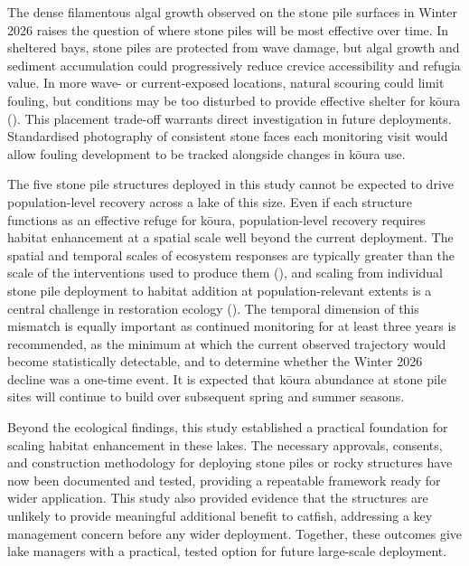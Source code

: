 \documentclass[
  letterpaper,
  DIV=11,
  numbers=noendperiod]{scrartcl}
\begin{document}
The dense filamentous algal growth observed on the stone pile surfaces
in Winter 2026 raises the question of where stone piles will be most
effective over time. In sheltered bays, stone piles are protected from
wave damage, but algal growth and sediment accumulation could
progressively reduce crevice accessibility and refugia value. In more
wave- or current-exposed locations, natural scouring could limit
fouling, but conditions may be too disturbed to provide effective
shelter for kōura ().
This placement trade-off warrants direct investigation in future
deployments. Standardised photography of consistent stone faces each
monitoring visit would allow fouling development to be tracked alongside
changes in kōura use.

The five stone pile structures deployed in this study cannot be expected
to drive population-level recovery across a lake of this size. Even if
each structure functions as an effective refuge for kōura,
population-level recovery requires habitat enhancement at a spatial
scale well beyond the current deployment. The spatial and temporal
scales of ecosystem responses are typically greater than the scale of
the interventions used to produce them (), and scaling from individual stone pile deployment to
habitat addition at population-relevant extents is a central challenge
in restoration ecology (). The temporal dimension of this mismatch is equally important as
continued monitoring for at least three years is recommended, as the
minimum at which the current observed trajectory would become
statistically detectable, and to determine whether the Winter 2026
decline was a one-time event. It is expected that kōura abundance at
stone pile sites will continue to build over subsequent spring and
summer seasons.

Beyond the ecological findings, this study established a practical
foundation for scaling habitat enhancement in these lakes. The necessary
approvals, consents, and construction methodology for deploying stone
piles or rocky structures have now been documented and tested, providing
a repeatable framework ready for wider application. This study also
provided evidence that the structures are unlikely to provide meaningful
additional benefit to catfish, addressing a key management concern
before any wider deployment. Together, these outcomes give lake managers
with a practical, tested option for future large-scale deployment.
\end{document}
